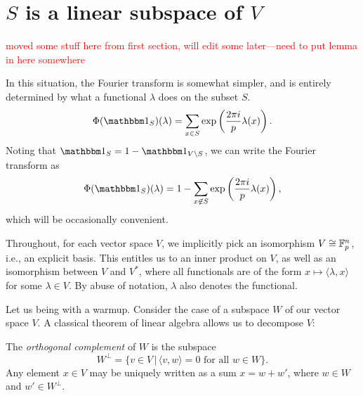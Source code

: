 \section{$S$ is a linear subspace of $V$}\label{sec:part0}
\textcolor{red}{moved some stuff here from first section, will edit some later---need to put lemma in here somewhere}

In this situation, the Fourier transform is somewhat simpler, and is entirely
determined by what a functional $\lambda$ does on the subset $S$.
\[ \Phi(\IND_S)(\lambda) = \sum_{x\in S} \exp \left(\frac{2\pi i}{p} \lambda(x)\right). \]
Noting that $\IND_S = 1 - \IND_{V\setminus S}$, we can write the Fourier transform as
\[ \Phi(\IND_S)(\lambda) = 1 - \sum_{x\not\in S} \exp \left(\frac{2\pi i}{p} \lambda(x)\right), \]
which will be occasionally convenient. 

\begin{rem}
	Throughout, for each vector space $V$, we implicitly pick an isomorphism 
	$V\cong\mathbb{F}_p^n$, i.e., an explicit basis. This
	entitles us to an inner product on $V$, as well as an isomorphism between $V$ and
	$V^*$, where all functionals are of the form $x \mapsto \langle \lambda, x \rangle$
	for some $\lambda\in V$. By abuse of notation, $\lambda$ also denotes the functional.
\end{rem}

Let us being with a warmup. Consider the case of a subspace $W$ of our vector space $V$.
A classical theorem of linear algebra allows us to decompose $V$:
\begin{prop}
    The \emph{orthogonal complement} of $W$ is the subspace    
    \[ W^\perp = \{ v \in V \,|\, \langle v, w \rangle = 0 \text{ for all } w \in W \}. \]
    Any element $x\in V$ may be uniquely written as a sum $x = w + w'$, where $w\in W$
    and $w'\in W^\perp$.
\end{prop}

